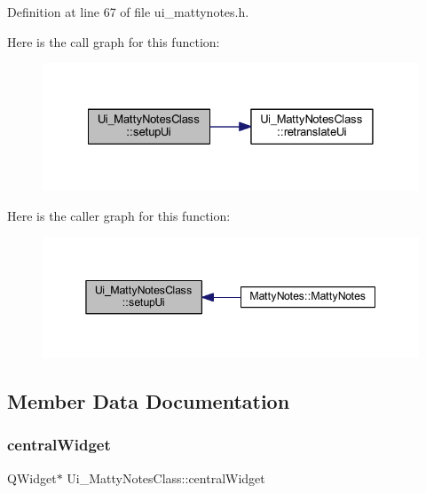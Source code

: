 Definition at line 67 of file ui\+\_\+mattynotes.\+h.

Here is the call graph for this function\+:
\nopagebreak
\begin{figure}[H]
\begin{center}
\leavevmode
\includegraphics[width=328pt]{classUi__MattyNotesClass_a33a88ea08595a64d445a104fcdfb4e7c_cgraph}
\end{center}
\end{figure}
Here is the caller graph for this function\+:
\nopagebreak
\begin{figure}[H]
\begin{center}
\leavevmode
\includegraphics[width=345pt]{classUi__MattyNotesClass_a33a88ea08595a64d445a104fcdfb4e7c_icgraph}
\end{center}
\end{figure}


\subsection{Member Data Documentation}
\hypertarget{classUi__MattyNotesClass_a2f1ad89276475aadfc0c1be6d8f387eb}{}\label{classUi__MattyNotesClass_a2f1ad89276475aadfc0c1be6d8f387eb} 
\subsubsection{\texorpdfstring{central\+Widget}{centralWidget}}
{\footnotesize\ttfamily Q\+Widget$\ast$ Ui\+\_\+\+Matty\+Notes\+Class\+::central\+Widget}



